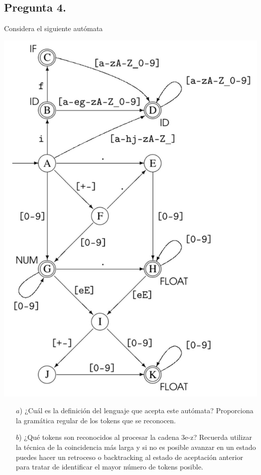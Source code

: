 \subsection*{Pregunta 4.}
Considera el siguiente autómata
\begin{multicols}{2}
\begin{center}
  \includegraphics[scale=0.30]{./Automata.png}
\end{center}

\begin{itemize}
\item[$a$)] ¿Cuál es la definición del lenguaje que acepta este autómata?
  Proporciona la gramática regular de los tokens que se reconocen.
\item[$b$)] ¿Qué tokens son reconocidos al procesar la cadena 3e-z? Recuerda
  utilizar la técnica de la coincidencia más larga y si no es posible avanzar
  en un estado puedes hacer un retroceso o backtracking al estado de aceptación
  anterior para tratar de identificar el mayor número de tokens posible.
\end{itemize}
\end{multicols}
